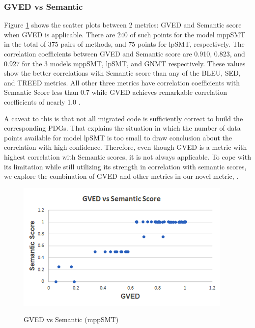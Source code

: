 \subsubsection{\textbf{GVED vs Semantic}}


Figure \ref{fig:GVEDmppSMT} shows the scatter plots between 2 metrics:
GVED and Semantic score when GVED is applicable. There are 240 of such
points for the model mppSMT in the total of 375 pairs of methods, and
75 points for lpSMT, respectively. The correlation coefficients between
GVED and Semantic score are 0.910, 0.823, and 0.927 for the 3 models mppSMT, lpSMT, and GNMT respectively. These values show the better correlations with
Semantic score than any of the BLEU, SED, and TREED metrics.
%
%
All other three metrics have correlation coefficients with Semantic
Score less than 0.7 while GVED achieves remarkable correlation
coefficients of nearly 1.0 . 
%
%

A caveat to this is that not all migrated code is sufficiently correct
to build the corresponding PDGs.
%
That explains the situation in which the number of data points
available for model lpSMT is too small to draw conclusion about the
correlation with high confidence. Therefore, even though GVED is a
metric with highest correlation with Semantic scores, it is not always
applicable. To cope with its limitation while still utilizing its
strength in correlation with semantic scores, we explore the
combination of GVED and other metrics in our novel metric, {\model}.


%
\begin{figure}
\caption{GVED vs Semantic (mppSMT)}
\centering
\includegraphics{img/gved_mppSMT.png}
\label{fig:GVEDmppSMT}
\end{figure}
